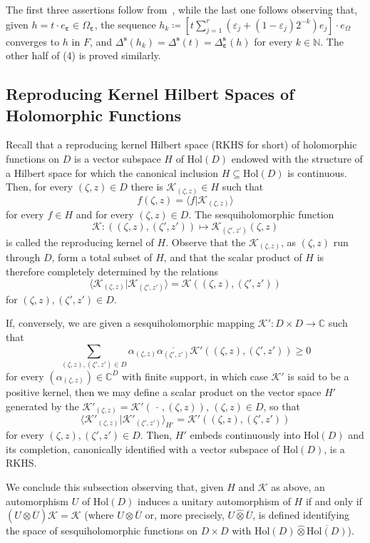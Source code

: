 \documentclass[10.5pt,reqno]{amsart}
\newcommand{\Hol}{\mathrm{Hol}}
\newcommand{\vect}[1]{\mathbf{{#1}}}
\newcommand{\N}{\mathds{N}}
\newcommand{\C}{\mathds{C}}
\newcommand{\epsb}{\mathbold{\eps}}
\newcommand{\Kc}{\mathcal{K}}
\newcommand{\Meg}{\geqslant}
\newcommand{\eps}{\varepsilon}
\begin{document}
The first three assertions follow from~\cite[Theorems 3.5 and 6.2]{Ishi}, while the last one follows observing that, given $h=t\cdot e_{\epsb}\in \Omega_\epsb$, the sequence $h_k\coloneqq [t \sum_{j=1}^r (\eps_j+ (1-\eps_j) 2^{-k} ) e_j]\cdot  e_\Omega $ converges to $h$ in $F$, and $\Delta^{\vect s}(h_k)=\Delta^{\vect s}(t)=\Delta_{ \epsb}^{\vect s}(h)$ for every $k\in\N$. The other half of (4) is proved similarly. 
	


\subsection{Reproducing Kernel Hilbert Spaces of Holomorphic Functions}\label{sec:2:8}
Recall that a reproducing kernel Hilbert space (RKHS for short) of holomorphic functions on $D$ is a vector subspace $H$ of $\Hol(D)$ endowed with the structure of a Hilbert space for which the canonical inclusion $H\subseteq\Hol(D)$ is continuous.
Then, for every $(\zeta,z)\in D$ there is $\Kc_{(\zeta,z)}\in H$ such that 
\[
f(\zeta,z)=\langle f \vert \Kc_{(\zeta,z)}\rangle
\]
for every $f\in H$ and for every $(\zeta,z)\in D$. The sesquiholomorphic function
\[
\Kc\colon ((\zeta,z),(\zeta',z'))\mapsto \Kc_{(\zeta',z')}(\zeta,z)
\]
is called the reproducing kernel of $H$. Observe that the $\Kc_{(\zeta,z)}$, as $(\zeta,z)$ run through $D$, form a total subset of $H$, and that the scalar product of $H$ is therefore completely determined by the relations
\[
\langle \Kc_{(\zeta,z)}\vert \Kc_{(\zeta',z')}\rangle=\Kc((\zeta,z),(\zeta',z'))
\]
for  $(\zeta,z),(\zeta',z')\in D$.

If, conversely, we are given a sesquiholomorphic mapping $\Kc'\colon D\times D\to \C$ such that
\[
\sum_{(\zeta,z),(\zeta',z')\in D} \alpha_{(\zeta,z)}\overline{\alpha_{(\zeta',z')}} \Kc'((\zeta,z),(\zeta',z'))\Meg 0
\]
for every $(\alpha_{(\zeta,z)})\in \C^D$ with finite support, in which case $\Kc'$ is said to be a positive kernel, then we may define a scalar product on the vector space $H'$ generated by the $\Kc'_{(\zeta,z)}=\Kc'(\,\cdot\,,(\zeta,z))$, $(\zeta,z)\in D$, so that
\[
\langle \Kc'_{(\zeta,z)}\vert \Kc'_{(\zeta',z')}\rangle_{H'}=\Kc'((\zeta,z),(\zeta',z'))
\]
for every $(\zeta,z),(\zeta',z')\in D$. Then, $H'$ embeds continuously into $\Hol(D)$ and its completion, canonically identified with a vector subspace of $\Hol(D)$, is a RKHS.

We conclude this subsection observing that, given $H$ and $\Kc$ as above, an automorphism $U$ of $\Hol(D)$ induces a unitary automorphism of $H$ if and only if $(U\otimes \overline U) \Kc=\Kc$ (where $U\otimes \overline U$ or, more precisely, $U\widehat \otimes \overline U$, is defined identifying the space of sesquiholomorphic functions on $D\times D$ with $\Hol(D)\widehat \otimes \overline{\Hol(D)}$).
\end{document}

